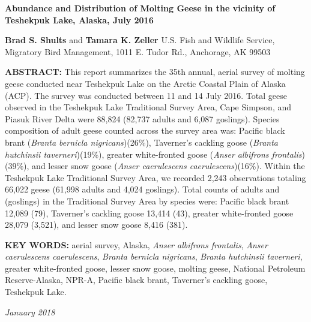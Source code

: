 \documentclass[]{article}
\title{}
\author{}
\date{}
\begin{document}
\pagestyle{fancy}
\renewcommand{\footrulewidth}{1pt} \renewcommand{\headrulewidth}{0pt}

\textbf{\LARGE{Abundance and Distribution of Molting Geese in the vicinity of Teshekpuk Lake, Alaska, July 2016}}
\hfill

\large
\textbf{Brad S. Shults} and \textbf{Tamara K. Zeller}\newline
U.S. Fish and Wildlife Service, Migratory Bird Management, 1011 E. Tudor
Rd., Anchorage, AK 99503

\textbf{\large{ABSTRACT:}} This report summarizes the 35th annual,
aerial survey of molting geese conducted near Teshekpuk Lake on the
Arctic Coastal Plain of Alaska (ACP). The survey was conducted between
11 and 14 July 2016. Total geese observed in the Teshekpuk Lake
Traditional Survey Area, Cape Simpson, and Piasuk River Delta were
88,824 (82,737 adults and 6,087 goslings). Species composition of adult
geese counted across the survey area was: Pacific black brant
(\textit{Branta bernicla nigricans})(26\%), Taverner's cackling goose
(\textit{Branta hutchinsii taverneri})(19\%), greater white-fronted
goose (\textit{Anser albifrons frontalis})(39\%), and lesser snow goose
(\textit{Anser caerulescens caerulescens})(16\%). Within the Teshekpuk
Lake Traditional Survey Area, we recorded 2,243 observations totaling
66,022 geese (61,998 adults and 4,024 goslings). Total counts of adults
and (goslings) in the Traditional Survey Area by species were: Pacific
black brant 12,089 (79), Taverner's cackling goose 13,414 (43), greater
white-fronted goose 28,079 (3,521), and lesser snow goose 8,416 (381).

\textbf{KEY WORDS: }aerial survey, Alaska,
\textit{Anser albifrons frontalis},
\textit{Anser caerulescens caerulescens},
\textit{Branta bernicla nigricans},
\textit{Branta hutchinsii taverneri}, greater white-fronted goose,
lesser snow goose, molting geese, National Petroleum Reserve-Alaska,
NPR-A, Pacific black brant, Taverner's cackling goose, Teshekpuk Lake.

\hfill\textit {January 2018}
\end{document}
